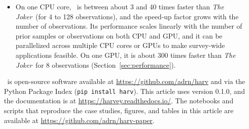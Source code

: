 \documentclass[twocolumn]{AASTeX7/aastex701}
\newcommand{\harv}{\package{harv}}
\newcommand{\joker}{\textsl{The Joker}}
\newcommand{\harvversion}{0.1.0}
\begin{document}
\begin{itemize}
    The rejection sampler is therefore most useful for sparse, noisy, or
    low-signal-to-noise data where other samplers struggle.
    But it is still useful as a first step for inference with more informative data.
  \item On one CPU core, \harv\ is between about 3 and 40 times faster than \joker\
    (for 4 to 128 observations), and the speed-up factor grows with the number of
    observations.
    Its performance scales linearly with the number of prior samples or observations on
    both CPU and GPU, and it can be parallelized across multiple CPU cores or GPUs to
    make survey-wide applications feasible.
    On one GPU, it is about 300 times faster than \joker\ for 8 observations
    (Section~\ref{sec:performance}).
\end{itemize}

\harv\ is open-source software available at \url{https://github.com/adrn/harv} and via
the Python Package Index (\texttt{pip install harv}).
This article uses version \harvversion, and the documentation is at
\url{https://harvey.readthedocs.io/}.
The notebooks and scripts that reproduce the case studies, figures, and tables in this
article are available at \url{https://github.com/adrn/harv-paper}.
\end{document}
